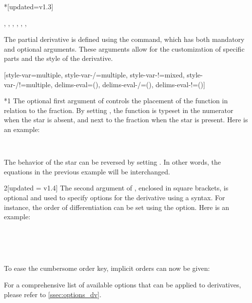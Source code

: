 \begin{function}*{\pdv}[updated=v1.3]
	\begin{syntax}
		\sarg, , , \targ{/}, \targ{!}, , 
	\end{syntax}
	The partial derivative is defined using the  command, which has both mandatory and optional arguments. These arguments allow for the customization of specific parts and the style of the derivative.
	\begin{definition}
		\DeclareDerivative{\pdv}{\partial}[style-var=multiple, style-var-/=multiple,
		style-var-!=mixed, style-var-/!=multiple, delims-eval=(), delims-eval-/=(),
		delims-eval-!=()]
	\end{definition}
	
	\begin{argument}*{1}
		The optional first argument of  controls the placement of the function in relation to the fraction. By setting , the function is typeset in the numerator when the star is absent, and next to the fraction when the star is present. Here is an example:
		\begin{example}
			 \\
		\end{example}
		The behavior of the star can be reversed by setting . In other words, the equations in the previous example will be interchanged.
	\end{argument}
	
	\begin{argument}{2}[updated = v1.4]
		The second argument of , enclosed in square brackets, is optional and used to specify options for the derivative using a  syntax. For instance, the order of differentiation can be set using the  option. Here is an example:
		\begin{example}
			\pdv[order={2,3}]{f}{x,y,z} \\
			\pdv[order={\beta,a,n+2a}]{f}{x,y,z} \\
			\pdv[sep-var-inf=0]{f}{x,y,z} \\
			\pdv[order={3/2-n/3,n/2,1/3}]{f}{x,y,z}
		\end{example}
		To ease the cumbersome order key, implicit orders can now be given:
		\begin{example}
			\pdv[n+2, \alpha]{f}{x,y,z}
		\end{example}
		For a comprehensive list of available options that can be applied to derivatives, please refer to \cref{ssec:options_dv}.
	\end{argument}
	

\end{function}
